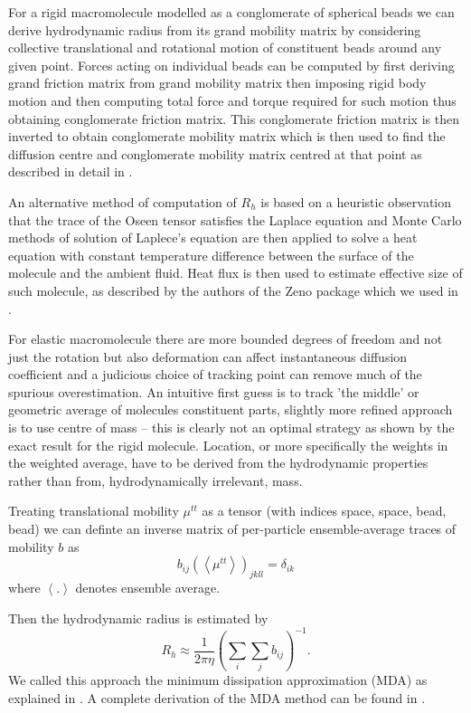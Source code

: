 \documentclass{doctoral}
\begin{document}
For a rigid macromolecule modelled as a conglomerate of spherical beads we can derive hydrodynamic radius from its grand mobility matrix by considering collective translational and rotational motion of constituent beads around any given point.
Forces acting on individual beads can be computed by first deriving grand friction matrix from grand mobility matrix then imposing rigid body motion and then computing total force and torque required for such motion thus obtaining conglomerate friction matrix.
This conglomerate friction matrix is then inverted to obtain conglomerate mobility matrix which is then used to find the diffusion centre and conglomerate mobility matrix centred at that point as described in detail in \cite{Cichocki_2019}.

An alternative method of computation of $R_h$ is based on a heuristic observation that the trace of the Oseen tensor satisfies the Laplace equation and Monte Carlo methods of solution of Laplece's equation are then applied to solve a heat equation with constant temperature difference between the surface of the molecule and the ambient fluid.
Heat flux is then used to estimate effective size of such molecule, as described by the authors of the Zeno package \cite{Juba_2017} which we used in \textcite{Waszkiewicz_2023_dna}.

For elastic macromolecule there are more bounded degrees of freedom and not just the rotation but also deformation can affect instantaneous diffusion coefficient and a judicious choice of tracking point can remove much of the spurious overestimation.
An intuitive first guess is to track 'the middle' or geometric average of molecules constituent parts, slightly more refined approach is to use centre of mass -- this is clearly not an optimal strategy as shown by the exact result for the rigid molecule.
Location, or more specifically the weights in the weighted average, have to be derived from the hydrodynamic properties rather than from, hydrodynamically irrelevant, mass.

Treating translational mobility $\mu^{tt}$ as a tensor (with indices space, space, bead, bead) we can definte an inverse matrix of per-particle ensemble-average traces of mobility $b$ as
\begin{equation}
    b_{ij} (\left< \mu^{tt} \right> )_{jkll} = \delta_{ik}
\end{equation}
where $\left< .
    \right>$ denotes ensemble average.

Then the hydrodynamic radius is estimated by
\begin{equation}
    R_h \approx \frac{1}{2 \pi \eta} \left( \sum_i \sum_j b_{ij} \right)^{-1}.
\end{equation}
We called this approach the minimum dissipation approximation (MDA) as explained in \textcite{Waszkiewicz_2024_mda}.
A complete derivation of the MDA method can be found in \textcite{Cichocki_2019}.
\end{document}
